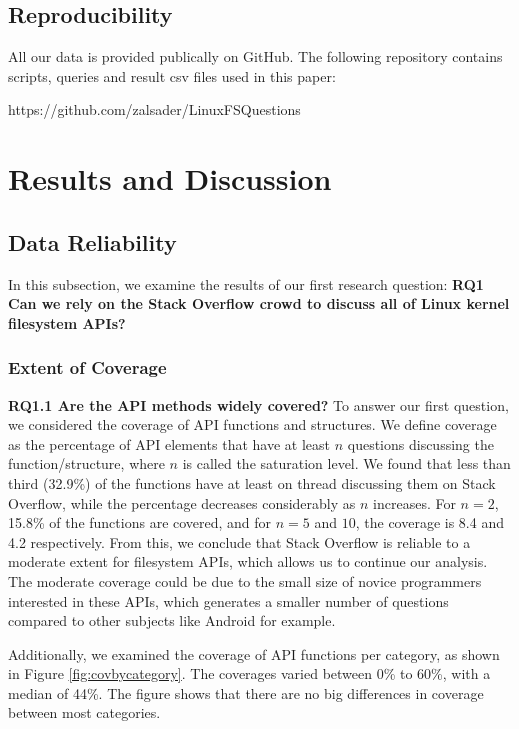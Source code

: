 \subsection{Reproducibility}\label{subsec:repr}
All our data is provided publically on GitHub. The following repository contains scripts, queries and result csv files used in this paper:

https://github.com/zalsader/LinuxFSQuestions

\section{Results and Discussion} \label{sec:results}
\subsection{Data Reliability}
In this subsection, we examine the results of our first research question: \textbf{RQ1 Can we rely on the Stack Overflow crowd to discuss all of Linux kernel filesystem APIs?}
\subsubsection{Extent of Coverage}
\textbf{RQ1.1 Are the API methods widely covered?}
To answer our first question, we considered the coverage of API functions and structures. We define coverage as the percentage of API elements that have at least $n$ questions discussing the function/structure, where $n$ is called the saturation level. We found that less than third (32.9\%) of the functions have at least on thread discussing them on Stack Overflow, while the percentage decreases considerably as $n$ increases. For $n=2$, 15.8\% of the functions are covered, and for $n=5$ and $10$, the coverage is 8.4 and 4.2 respectively. From this, we conclude that Stack Overflow is reliable to a moderate extent for filesystem APIs, which allows us to continue our analysis. The moderate coverage could be due to the small size of novice programmers interested in these APIs, which generates a smaller number of questions compared to other subjects like Android for example.

Additionally, we examined the coverage of API functions per category, as shown in Figure \ref{fig:covbycategory}. The coverages varied between 0\% to 60\%, with a median of 44\%. The figure shows that there are no big differences in coverage between most categories.

